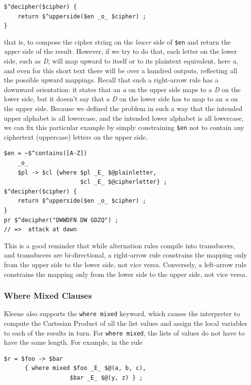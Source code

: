 \begin{Verbatim}
$^decipher($cipher) {
    return $^upperside($en _o_ $cipher) ;
}
\end{Verbatim}

\noindent
that is, to compose the cipher string on the \emph{lower} side of \verb!$en! and return the \emph{upper} side of the
result.  However, if we try to do that, each letter on the lower side, such as \emph{D}, will map upward to itself or to its
plaintext equivalent, here \emph{a}, and even for this short text there will be over a hundred outputs, reflecting all the
possible upward mappings.  Recall that such
a right-arrow rule has a downward orientation:  it states that an \emph{a} on the upper side maps to a \emph{D} on the
lower side, but it doesn't say that a \emph{D} on the lower side has to map to an \emph{a} on the upper side.  Because we
defined the problem in such a way that the intended upper alphabet is all lowercase, and the intended lower alphabet is all
lowercase, we can fix
this particular example by simply constraining \verb!$en! not to contain any ciphertext (uppercase) letters on the upper side.

\begin{Verbatim}
$en = ~$^contains([A-Z])
	_o_
	$pl -> $cl {where $pl _E_ $@plainletter,
                      $cl _E_ $@cipherletter} ;
$^decipher($cipher) {
    return $^upperside($en _o_ $cipher) ;
}
pr $^decipher("DWWDFN DW GDZQ") ;
// =>  attack at dawn
\end{Verbatim}

\noindent
This is a good reminder that while alternation rules compile into transducers, and transducers are bi-directional, a
right-arrow rule constrains the mapping only from the upper side to the
lower side, not vice versa.  Conversely, a left-arrow rule constrains
the mapping only from the lower side to the upper side, not vice versa.


\subsubsection{Where Mixed Clauses}

Kleene also supports the \texttt{where mixed} keyword, which causes the
interpreter to compute the Cartesian Product of all the list values and
assign the local variables to each of the results in turn.  For
\texttt{where mixed}, the lists of values do not have to have the same
length.  For example, in the rule

\begin{Verbatim}
$r = $foo -> $bar 
      { where mixed $foo _E_ $@(a, b, c), 
	               $bar _E_ $@(y, z) } ;
\end{Verbatim}

